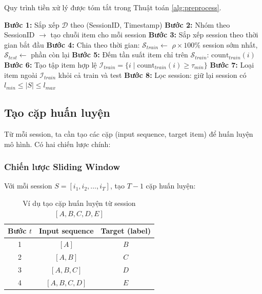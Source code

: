 \documentclass[12pt, a4paper]{article}
\begin{document}
Quy trình tiền xử lý được tóm tắt trong Thuật toán \ref{alg:preprocess}.

\begin{algorithm}[H]
\SetAlgoLined
{}

\textbf{Bước 1:} Sắp xếp $\mathcal{D}$ theo (SessionID, Timestamp)\;
\textbf{Bước 2:} Nhóm theo SessionID $\rightarrow$ tạo chuỗi item cho mỗi session\;
\textbf{Bước 3:} Sắp xếp session theo thời gian bắt đầu\;
\textbf{Bước 4:} Chia theo thời gian: $\mathcal{S}_{train} \leftarrow$ $\rho \times 100\%$ session sớm nhất, $\mathcal{S}_{test} \leftarrow$ phần còn lại\;
\textbf{Bước 5:} Đếm tần suất item chỉ trên $\mathcal{S}_{train}$: $\text{count}_{train}(i)$\;
\textbf{Bước 6:} Tạo tập item hợp lệ $\mathcal{I}_{train} = \{i \mid \text{count}_{train}(i) \geq \tau_{min}\}$\;
\textbf{Bước 7:} Loại item ngoài $\mathcal{I}_{train}$ khỏi cả train và test\;
\textbf{Bước 8:} Lọc session: giữ lại session có $l_{min} \leq |S| \leq l_{max}$\;

\caption{Tiền xử lý dữ liệu session}
\label{alg:preprocess}
\end{algorithm}

\subsection{Tạo cặp huấn luyện}

Từ mỗi session, ta cần tạo các cặp (input sequence, target item) để huấn luyện mô hình. Có hai chiến lược chính:

\subsubsection{Chiến lược Sliding Window}

Với mỗi session $S = [i_1, i_2, \ldots, i_T]$, tạo $T-1$ cặp huấn luyện:

\begin{table}[H]
\centering
\caption{Ví dụ tạo cặp huấn luyện từ session $[A, B, C, D, E]$}
\label{tab:training_pairs}
\begin{tabular}{ccc}
\toprule
\textbf{Bước $t$} & \textbf{Input sequence} & \textbf{Target (label)} \\
\midrule
1 & $[A]$ & $B$ \\
2 & $[A, B]$ & $C$ \\
3 & $[A, B, C]$ & $D$ \\
4 & $[A, B, C, D]$ & $E$ \\
\bottomrule
\end{tabular}
\end{table}
\end{document}
